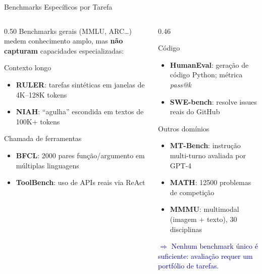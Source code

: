 \documentclass[aspectratio=169, xcolor=dvipsnames]{beamer}
\begin{document}
  \begin{frame}{Benchmarks Específicos por Tarefa}
    \begin{columns}[T]
      \begin{column}{0.50\textwidth}
        {\footnotesize Benchmarks gerais (MMLU, ARC\ldots) medem conhecimento amplo, mas \textbf{não capturam} capacidades especializadas:}
        \begin{block}{Contexto longo}
          {\footnotesize\begin{itemize}
            \item \textbf{RULER}: tarefas sintéticas em janelas de 4K--128K tokens
            \item \textbf{NIAH}: ``agulha'' escondida em textos de 100K+ tokens
          \end{itemize}}
        \end{block}
        \begin{block}{Chamada de ferramentas}
          {\footnotesize\begin{itemize}
            \item \textbf{BFCL}: 2000 pares função/argumento em múltiplas linguagens
            \item \textbf{ToolBench}: uso de APIs reais via ReAct
          \end{itemize}}
        \end{block}
      \end{column}
      \begin{column}{0.46\textwidth}
        \begin{block}{Código}
          {\footnotesize\begin{itemize}
            \item \textbf{HumanEval}: geração de código Python; métrica \textit{pass@k}
            \item \textbf{SWE-bench}: resolve issues reais do GitHub
          \end{itemize}}
        \end{block}
        \begin{block}{Outros domínios}
          {\footnotesize\begin{itemize}
            \item \textbf{MT-Bench}: instrução multi-turno avaliada por GPT-4
            \item \textbf{MATH}: 12500 problemas de competição
            \item \textbf{MMMU}: multimodal (imagem + texto), 30 disciplinas
          \end{itemize}}
        \end{block}
        \vspace{0.2em}
        {\footnotesize \textcolor{DarkBlue}{$\Rightarrow$ Nenhum benchmark único é suficiente: avaliação requer um portfólio de tarefas.}}
      \end{column}
    \end{columns}
  \end{frame}
\end{document}
